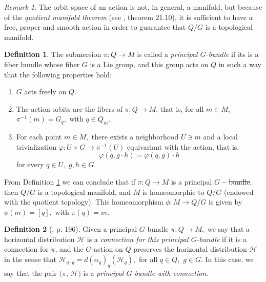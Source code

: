 \documentclass[12pt, letterpaper, reqno]{amsart}
\theoremstyle{definition}
\newtheorem{df}{Definition}
\theoremstyle{plain}
\theoremstyle{remark}
\newtheorem{rem}{Remark}
\providecommand{\DIFadd}[1]{{\protect\color{blue}\uwave{#1}}} %
\providecommand{\DIFdel}[1]{{\protect\color{red}\sout{#1}}}                      %
\providecommand{\DIFaddbegin}{} %
\providecommand{\DIFaddend}{} %
\providecommand{\DIFdelbegin}{} %
\providecommand{\DIFdelend}{} %
\newcommand{\DIFscaledelfig}{0.5}
\newlength{\DIFdelgraphicswidth} %
\newlength{\DIFdelgraphicsheight} %
\newcommand{\DIFaddincludegraphics}[2][]{{\color{blue}\fbox{\DIFOincludegraphics[#1]{#2}}}} %
\newcommand{\DIFdelincludegraphics}[2][]{%
\sbox{\DIFdelgraphicsbox}{\DIFOincludegraphics[#1]{#2}}%
\settoboxwidth{\DIFdelgraphicswidth}{\DIFdelgraphicsbox} %
\settoboxtotalheight{\DIFdelgraphicsheight}{\DIFdelgraphicsbox} %
\scalebox{\DIFscaledelfig}{%
\parbox[b]{\DIFdelgraphicswidth}{\usebox{\DIFdelgraphicsbox}\\[-\baselineskip] \rule{\DIFdelgraphicswidth}{0em}}\llap{\resizebox{\DIFdelgraphicswidth}{\DIFdelgraphicsheight}{%
\setlength{\unitlength}{\DIFdelgraphicswidth}%
\begin{picture}(1,1)%
\thicklines\linethickness{2pt} %
{\color[rgb]{1,0,0}\put(0,0){\framebox(1,1){}}}%
{\color[rgb]{1,0,0}\put(0,0){\line( 1,1){1}}}%
{\color[rgb]{1,0,0}\put(0,1){\line(1,-1){1}}}%
\end{picture}%
}\hspace*{3pt}}} %
} %
\DeclareRobustCommand{\DIFaddbegin}{\DIFOaddbegin \let\includegraphics\DIFaddincludegraphics} %
\DeclareRobustCommand{\DIFaddend}{\DIFOaddend \let\includegraphics\DIFOincludegraphics} %
\DeclareRobustCommand{\DIFdelbegin}{\DIFOdelbegin \let\includegraphics\DIFdelincludegraphics} %
\DeclareRobustCommand{\DIFdelend}{\DIFOaddend \let\includegraphics\DIFOincludegraphics} %
\begin{document}
\begin{rem}
The orbit space of an action is not, in general, a manifold, but because of the \textit{quotient manifold theorem} (see \cite{lee2003introduction}, theorem 21.10), it is sufficient to have a free, proper and smooth action in order to guarantee that $ Q/G $ is a topological manifold.
\end{rem}
\begin{df}\label{df:principalGbundle}
	The submersion $ \pi: Q \rightarrow M$  is called a \textit{principal $ G $-bundle} if its is a fiber bundle whose fiber $ G $ is a Lie group, and this group acts on $ Q $ in such a way that the following properties hold:
	\begin{enumerate}
		\item $ G $ acts freely on $ Q $.
		\item The action orbits are the fibers of $ \pi:Q \rightarrow {M} $, that is, for all $ m\in M, $ $ \pi^{-1}(m) = G_q, $ with $ q\in Q_m. $ 
		\item For each point $ m\in M, $ there exists a neighborhood $ U\ni m $ and a local trivialization $ \varphi: U\times G \rightarrow \pi^{-1}(U)$ equivariant with the action, that is,
			$$ \varphi(q, g\cdot h)=\varphi(q,g)\cdot h  $$ 
			for every $ q\in U, $ $ g,h\in G. $ 
	\end{enumerate}
\end{df}

From Definition \ref{df:principalGbundle} we can conclude that if $ \pi: Q \rightarrow M $ is a principal \DIFdelbegin \DIFdel{$ G- $bundle}\DIFdelend \DIFaddbegin \DIFadd{$ G $-bundle}\DIFaddend , then $Q/G  $ is a topological manifold, and $M $ is homeomorphic to $ Q/G $ (endowed with the quotient topology). This homeomorphism $ \phi: M \rightarrow {Q/G}$  is given by $ \phi(m)=[q], $ with $ \pi(q)=m. $ 

\begin{df}[\cite{montgomery2002tour}, p. 196]
	Given a principal $ G $-bundle $ \pi: Q \rightarrow M, $ we say that a horizontal distribution $ \mathcal{H} $ is a \textit{connection for this principal $ G $-bundle} if it is a connection for $ \pi $, and the $ G $-action \DIFaddbegin \DIFadd{$ \alpha $  }\DIFaddend on $ Q $ preserves the horizontal distribution $ \mathcal{H} $ in the sense that $ \mathcal{H}_{q\cdot g} = d(\alpha_g)_q (\mathcal{H}_q), $ for all $ q\in Q, $ $ g\in G $. In this case, we say that the pair $ (\pi$, $ \mathcal{H}) $ is a \textit{principal $ G $-bundle with connection}. 

\end{df}
\end{document}
